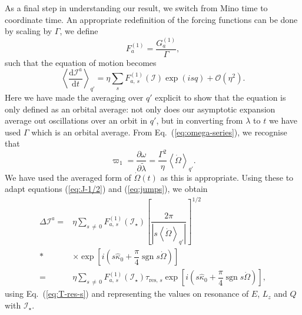\documentclass[aps,prd,amsfonts,amssymb,amsmath,nofootinbib,showpacs,superscriptaddress,twocolumn,floatfix]{revtex4-1}
\newcommand{\eqnref}[1]{Eq.~(\ref{eq:#1})}
\newcommand{\dd}{\ensuremath{\mathrm{d}}}
\newcommand{\diff}[2]{\ensuremath{\dfrac{\dd {#1}}{\dd {#2}}}}
\newcommand{\partialdiff}[2]{\ensuremath{\dfrac{\partial {#1}}{\partial {#2}}}}
\newcommand{\order}[1]{\ensuremath{\mathcal{O}({#1})}}
\DeclareMathOperator{\sgn}{sgn}
\begin{document}
As a final step in understanding our result, we switch from Mino time to coordinate time. An appropriate redefinition of the forcing functions can be done by scaling by $\Gamma$, we define
\begin{equation}
F_a^{(1)} = \dfrac{G_a^{(1)}}{\Gamma},
\end{equation}
such that the equation of motion becomes
\begin{equation}
\left\langle \diff{\mathcal{I}^a}{t}\right\rangle_{q'} =  \eta\sum_s F_{a,\,s}^{(1)}(\boldsymbol{\mathcal{I}})\exp(is q) + \order{\eta^2}.
\end{equation}
Here we have made the averaging over $q'$ explicit to show that the equation is only defined as an orbital average: not only does our asymptotic expansion average out oscillations over an orbit in $q'$, but in converting from $\lambda$ to $t$ we have used $\Gamma$ which is an orbital average.
From \eqnref{omega-series}, we recognise that
\begin{equation}
\varpi_1 = \partialdiff{\omega}{\widetilde{\lambda}} = \dfrac{\Gamma^2}{\eta}\left\langle\dot{\Omega}\right\rangle_{q'}.
\end{equation}
We have used the averaged form of $\dot{\Omega}(t)$ as this is appropriate. Using these to adapt equations (\ref{eq:J-1/2}) and (\ref{eq:jumps}), we obtain
\begin{align}
\Delta \mathcal{I}^a = {} & \eta\sum_{s\,\neq\,0}F_{a,\,s}^{(1)}(\boldsymbol{\mathcal{I}}_\star)\left[\dfrac{2\pi}{\left|s \left\langle\dot{\Omega}\right\rangle_{q'}\right|}\right]^{1/2} \nonumber \\*
 {} & \times \left.\exp\left[i\left(s \widehat{\kappa}_0 + \dfrac{\pi}{4}\sgn s\dot{\Omega}\right)\right]\right. \\
 = {} & \eta\sum_{s\,\neq\,0}F_{a,\,s}^{(1)}(\boldsymbol{\mathcal{I}}_\star)\tau_{\mathrm{res},\,s}\exp\left[i\left(s \widehat{\kappa}_0 + \dfrac{\pi}{4} \sgn s\dot{\Omega} \right)\right],
\end{align}
using \eqnref{T-res-s} and representing the values on resonance of $E$, $L_z$ and $Q$ with $\boldsymbol{\mathcal{I}}_\star$.


\end{document}
